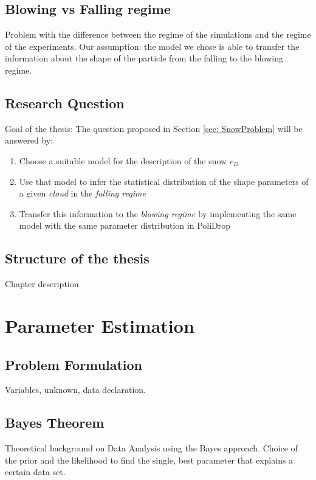 \documentclass[a4paper,12pt,twoside,titlepage,openright]{book}
\newcommand{\sref}[1]{Section \ref{#1}}
\begin{document}
	\section{Blowing vs Falling regime}
		Problem with the difference between the regime of the simulations and the regime of the experiments. Our assumption: the model we chose is able to transfer the information about the shape of the particle from the falling to the blowing regime.

		
	\section{Research Question}
		Goal of the thesis: The question proposed in \sref{sec: SnowProblem} will be answered by:
		\begin{enumerate}
			\item Choose a suitable model for the description of the snow $ c_D $
			\item Use that model to infer the statistical distribution of the shape parameters of a given \textit{cloud} in the \textit{falling regime}
			\item Transfer this information to the \textit{blowing regime} by implementing the same model with the same parameter distribution in PoliDrop
		\end{enumerate}	

	\section{Structure of the thesis}
		Chapter description
		
		


\chapter{Parameter Estimation}
\label{ch: Estimation}
	\section{Problem Formulation}
	\label{sec: problemFormulation}
		Variables, unknown, data declaration.

	\section{Bayes Theorem}
	\label{sec: Bayes}
		Theoretical background on Data Analysis using the Bayes approach. Choice of the prior and the likelihood to find the single, best parameter that explains a certain data set.
		
\end{document}
